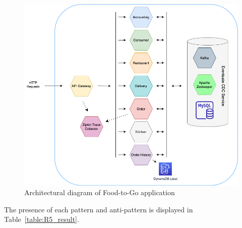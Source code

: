 \documentclass{Configuration_Files/PoliMi3i_thesis}
\begin{document}
\begin{figure}[H]
\centering
\includegraphics[width=1\textwidth]{myImages/R5.png}
\caption{Architectural diagram of Food-to-Go application}
\label{fig:R5_arch}
\end{figure}

The presence of each pattern and anti-pattern is displayed in Table~\ref{table:R5_result}.
\end{document}
